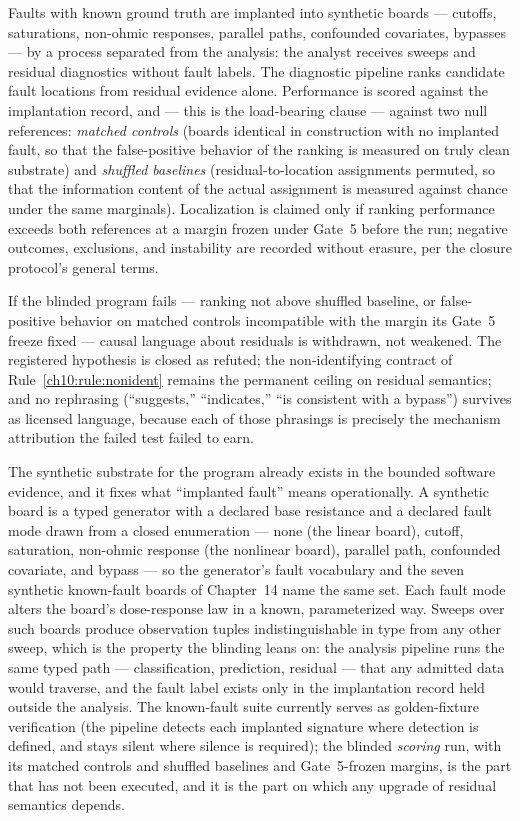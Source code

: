 Faults with known ground truth are implanted into synthetic boards ---
cutoffs, saturations, non-ohmic responses, parallel paths, confounded
covariates, bypasses --- by a process separated from the analysis: the
analyst receives sweeps and residual diagnostics without fault labels.
The diagnostic pipeline ranks candidate fault locations from residual
evidence alone. Performance is scored against the implantation record,
and --- this is the load-bearing clause --- against two null references:
\emph{matched controls} (boards identical in construction with no
implanted fault, so that the false-positive behavior of the ranking is
measured on truly clean substrate) and \emph{shuffled baselines}
(residual-to-location assignments permuted, so that the information
content of the actual assignment is measured against chance under the
same marginals). Localization is claimed only if ranking performance
exceeds both references at a margin frozen under Gate~5 before the run;
negative outcomes,
exclusions, and instability are recorded without erasure, per the
closure protocol's general terms.

\begin{protocol}\label{ch10:prot:withdrawal}
If the blinded program fails --- ranking not above shuffled baseline, or
false-positive behavior on matched controls incompatible with the
margin its Gate~5 freeze fixed --- causal language about residuals is withdrawn,
not weakened. The registered hypothesis is closed as refuted; the
non-identifying contract of Rule~\ref{ch10:rule:nonident} remains the
permanent ceiling on residual semantics; and no rephrasing (``suggests,''
``indicates,'' ``is consistent with a bypass'') survives as licensed
language, because each of those phrasings is precisely the mechanism
attribution the failed test failed to earn.
\end{protocol}

The synthetic substrate for the program already exists in the bounded
software evidence, and it fixes what
``implanted fault'' means operationally. A synthetic board is a typed
generator with a declared base resistance and a declared fault mode
drawn from a closed enumeration --- none (the linear board), cutoff,
saturation, non-ohmic response (the nonlinear board), parallel path,
confounded covariate, and bypass --- so the generator's fault
vocabulary and the seven synthetic known-fault boards of Chapter~14
name the same set. Each fault mode alters the board's dose-response
law in a known, parameterized way. Sweeps over such boards produce observation tuples
indistinguishable in type from any other sweep, which is the property
the blinding leans on: the analysis pipeline runs the same typed path
--- classification, prediction, residual --- that any admitted data
would traverse, and the fault label exists only in the implantation
record held outside the analysis. The known-fault suite currently
serves as golden-fixture verification (the pipeline detects each
implanted signature where detection is defined, and stays silent where
silence is required); the blinded \emph{scoring} run, with its matched
controls and shuffled baselines and Gate~5-frozen margins, is the part
that has not been executed, and it is the part on which any upgrade of
residual semantics depends.

